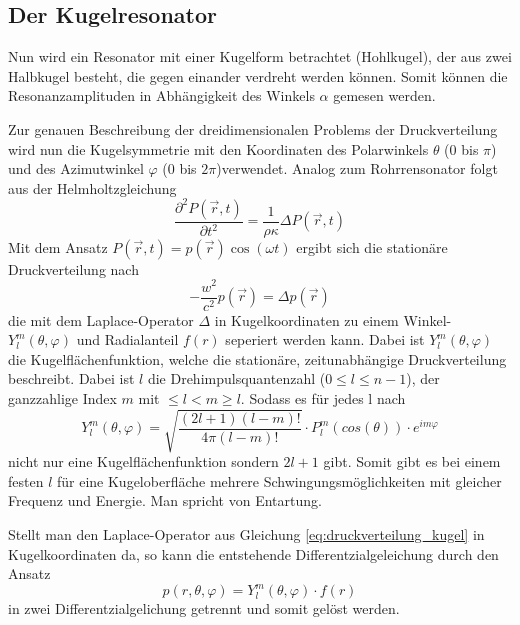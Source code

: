 \subsection{Der Kugelresonator}
Nun wird ein Resonator mit einer Kugelform betrachtet (Hohlkugel), der aus zwei Halbkugel besteht, die gegen einander verdreht werden können.
Somit können die Resonanzamplituden in Abhängigkeit des Winkels $\alpha$ gemesen werden.

Zur genauen Beschreibung der dreidimensionalen Problems der Druckverteilung wird nun die Kugelsymmetrie mit den Koordinaten des Polarwinkels $\theta$ (0 bis $\pi$)
und des Azimutwinkel $\varphi$ (0 bis $2\pi$)verwendet.
Analog zum Rohrrensonator folgt aus der Helmholtzgleichung
\begin{equation}
    \frac{\partial^2 P(\vec{r}{,}t)}{\partial t^2}=\frac{1}{\rho\kappa}\Delta P(\vec{r}{,}t)
\end{equation}
Mit dem Ansatz $P(\vec{r}{,}t)=p(\vec{r})\cos{(\omega t)}$ ergibt sich die stationäre 
Druckverteilung nach
\begin{equation}
    -\frac{w^2}{c^2}p(\vec{r})=\Delta p(\vec{r})
    \label{eq:druckverteilung_kugel}
\end{equation}
die mit dem Laplace-Operator $\Delta$ in Kugelkoordinaten zu einem Winkel- $Y_l^m(\theta{,}\varphi)$ und 
Radialanteil $f(r)$ seperiert werden kann. Dabei ist $Y_l^m(\theta{,}\varphi)$ die Kugelflächenfunktion, welche die 
stationäre, zeitunabhängige Druckverteilung beschreibt. Dabei ist $l$ die Drehimpulsquantenzahl ($0\leq l \leq n-1$),
der ganzzahlige Index $m$ mit $ \leq l<m \geq l$. Sodass es für jedes l nach
\begin{equation}
    Y^m_l(\theta{,}\varphi)=\sqrt{\frac{(2l+1)(l-m)!}{4\pi(l-m)!}}\cdot P_l^m(cos(\theta)) \cdot e^{im\varphi}
\end{equation}
nicht nur eine Kugelflächenfunktion sondern $2l+1$ gibt. Somit gibt es bei einem festen $l$ für eine Kugeloberfläche
mehrere Schwingungsmöglichkeiten mit gleicher Frequenz und Energie. Man spricht von Entartung.

Stellt man den Laplace-Operator aus Gleichung \ref{eq:druckverteilung_kugel} in Kugelkoordinaten da,
so kann die entstehende Differentzialgeleichung durch den Ansatz
\begin{equation}
    p(r{,}\theta{,}\varphi)=Y_l^m(\theta{,}\varphi)\cdot f(r)
\end{equation}
in zwei Differentzialgelichung getrennt und somit gelöst werden.

